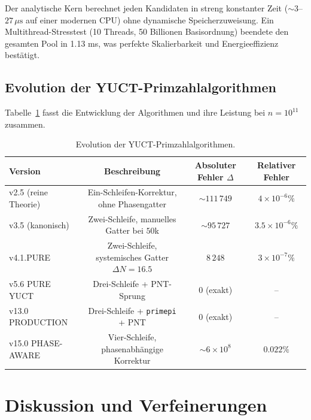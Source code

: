 \documentclass[11pt,a4paper]{article}
\begin{document}
	Der analytische Kern berechnet jeden Kandidaten in streng konstanter Zeit (\(\sim 3\)--\(27\,\mu\text{s}\) auf einer modernen CPU) ohne dynamische Speicherzuweisung. Ein Multithread-Stresstest (10 Threads, 50 Billionen Basisordnung) beendete den gesamten Pool in 1.13 ms, was perfekte Skalierbarkeit und Energieeffizienz bestätigt.
	
	\subsection{Evolution der YUCT-Primzahlalgorithmen}
	Tabelle~\ref{tab:all-versions} fasst die Entwicklung der Algorithmen und ihre Leistung bei \(n=10^{11}\) zusammen.
	
	\begin{table}[htbp]
		\centering
		\caption{Evolution der YUCT-Primzahlalgorithmen.}
		\label{tab:all-versions}
		\begin{tabular}{l c c c}
			\toprule
			Version & Beschreibung & Absoluter Fehler \(\Delta\) & Relativer Fehler \\
			\midrule
			v2.5 (reine Theorie)  & Ein-Schleifen-Korrektur, ohne Phasengatter & \(\sim 111\,749\) & \(4\times10^{-6}\%\) \\
			v3.5 (kanonisch)    & Zwei-Schleife, manuelles Gatter bei \(50\)k & \(\sim 95\,727\) & \(3.5\times10^{-6}\%\) \\
			v4.1.PURE           & Zwei-Schleife, systemisches Gatter \(\Delta N=16.5\) & \(8\,248\) & \(3\times10^{-7}\%\) \\
			v5.6 PURE YUCT      & Drei-Schleife + PNT-Sprung & 0 (exakt) & -- \\
			v13.0 PRODUCTION    & Drei-Schleife + \texttt{primepi} + PNT & 0 (exakt) & -- \\
			v15.0 PHASE-AWARE   & Vier-Schleife, phasenabhängige Korrektur & \(\sim 6\times10^{8}\) & \(0.022\%\) \\
			\bottomrule
		\end{tabular}
	\end{table}
	
	\section{Diskussion und Verfeinerungen}
	\label{sec:discussion}
	
\end{document}
